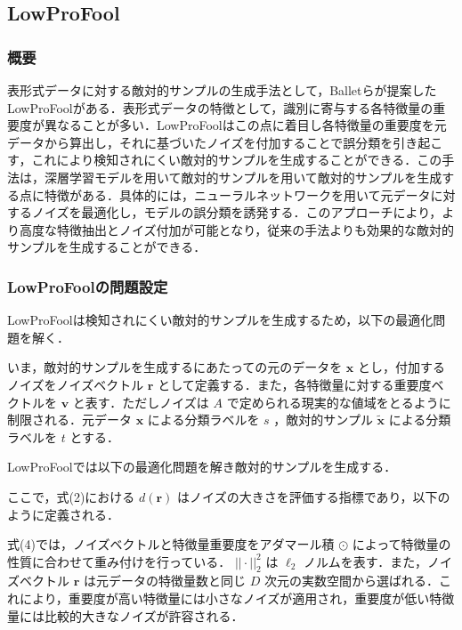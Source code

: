 \subsection{LowProFool}
\subsubsection{概要}
表形式データに対する敵対的サンプルの生成手法として，Balletらが提案したLowProFool\cite{ballet2019imperceptible}がある．表形式データの特徴として，識別に寄与する各特徴量の重要度が異なることが多い．LowProFoolはこの点に着目し各特徴量の重要度を元データから算出し，それに基づいたノイズを付加することで誤分類を引き起こす，これにより検知されにくい敵対的サンプルを生成することができる．この手法は，深層学習モデルを用いて敵対的サンプルを用いて敵対的サンプルを生成する点に特徴がある．具体的には，ニューラルネットワークを用いて元データに対するノイズを最適化し，モデルの誤分類を誘発する．このアプローチにより，より高度な特徴抽出とノイズ付加が可能となり，従来の手法よりも効果的な敵対的サンプルを生成することができる．

\subsubsection{LowProFoolの問題設定}
LowProFoolは検知されにくい敵対的サンプルを生成するため，以下の最適化問題を解く．

いま，敵対的サンプルを生成するにあたっての元のデータを $\bm{x}$ とし，付加するノイズをノイズベクトル $\bm{r}$ として定義する．また，各特徴量に対する重要度ベクトルを $\bm{v}$ と表す．ただしノイズは $A$ で定められる現実的な値域をとるように制限される．元データ $\bm{x}$ による分類ラベルを $s$ ，敵対的サンプル $\bm{\tilde{x}}$ による分類ラベルを $t$ とする．

LowProFoolでは以下の最適化問題を解き敵対的サンプルを生成する．

ここで，式(2)における $d(\bm{r})$ はノイズの大きさを評価する指標であり，以下のように定義される．

式(4)では，ノイズベクトルと特徴量重要度をアダマール積 $\odot$ によって特徴量の性質に合わせて重み付けを行っている． $||\cdot||^2_2$ は $\ell_2$ ノルムを表す．また，ノイズベクトル $\bm{r}$ は元データの特徴量数と同じ $D$ 次元の実数空間から選ばれる．これにより，重要度が高い特徴量には小さなノイズが適用され，重要度が低い特徴量には比較的大きなノイズが許容される．

